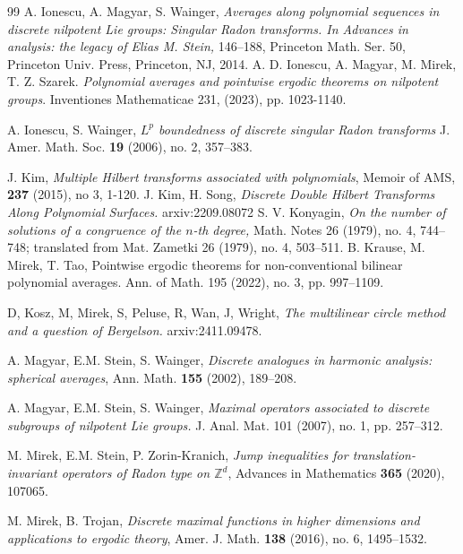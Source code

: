 \documentclass[11 pt,letterpaper]{amsart}
\theoremstyle{plain}
\theoremstyle{definition}
\theoremstyle{remark} \theoremstyle{exam} \theoremstyle{ob}
\numberwithin{equation}{section}
\begin{document}
\begin{thebibliography}{99}
 A. Ionescu, A. Magyar, S. Wainger, \emph{ Averages along polynomial sequences in discrete nilpotent Lie groups:
Singular Radon transforms. In Advances in analysis: the legacy of Elias M. Stein,}  146--188, Princeton Math.
Ser. 50, Princeton Univ. Press, Princeton, NJ, 2014.
 A. D. Ionescu,  A. Magyar,  M. Mirek, T. Z. Szarek. \emph{Polynomial averages and pointwise ergodic theorems
on nilpotent groups}. Inventiones Mathematicae 231, (2023), pp. 1023-1140.

  A. Ionescu, S. Wainger, \emph{$L^p$
boundedness of discrete singular Radon transforms} J. Amer. Math. Soc. \textbf{19}
(2006), no. 2, 357--383.
 
 
 
  J. Kim, \emph{Multiple Hilbert transforms associated with polynomials}, Memoir of AMS, \textbf{237} (2015), no 3, 1-120.
	 J. Kim, H. Song, \emph{Discrete Double Hilbert Transforms Along
		Polynomial Surfaces.}   	arxiv:2209.08072
S. V. Konyagin, \emph{On the number of solutions of a congruence of the $n$-th degree,}
 Math. Notes 26 (1979), no. 4, 744–748; translated from Mat. Zametki 26 (1979), no. 4, 503–511.
 B. Krause, M. Mirek, T. Tao, Pointwise ergodic theorems for non-conventional bilinear polynomial
averages. Ann. of Math. 195 (2022), no. 3, pp. 997–1109.



  D, Kosz, M, Mirek, S, Peluse, R, Wan, J, Wright, \emph{The multilinear circle method and a question of Bergelson.}
arxiv:2411.09478.



 

  A. Magyar, E.M. Stein, S. Wainger, \emph{Discrete analogues in harmonic analysis: spherical averages},  Ann.
Math. \textbf{155} (2002), 189--208.

 A. Magyar, E.M. Stein, S. Wainger, \emph{Maximal operators associated to discrete subgroups of nilpotent Lie	groups. } J. Anal. Mat. 101 (2007), no. 1, pp. 257–312.

 M. Mirek, E.M. Stein, P. Zorin-Kranich, \emph{Jump inequalities for translation-invariant operators of Radon
type on $\mathbb{Z}^d$},  Advances in Mathematics \textbf{365} (2020),  107065.

M. Mirek, B. Trojan, \emph{Discrete maximal functions in higher dimensions and applications to ergodic theory}, Amer. J. Math. \textbf{138} (2016), no. 6, 1495--1532.
 

\end{thebibliography}
\end{document}
